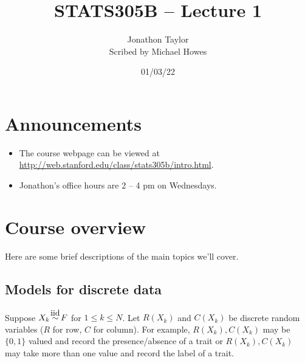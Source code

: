 




\title{STATS305B -- Lecture 1}
\author{Jonathon Taylor\\ Scribed by Michael Howes}
\date{01/03/22}

\pagestyle{fancy}
\fancyhf{}


\maketitle
\tableofcontents
\section{Announcements}
\begin{itemize}
    \item The course webpage can be viewed at \href{http://web.stanford.edu/class/stats305b/intro.html}{http://web.stanford.edu/class/stats305b/intro.html}.
    \item Jonathon's office hours are 2 -- 4 pm on Wednesdays.
\end{itemize}
\section{Course overview}
Here are some brief descriptions of the main topics we'll cover.
\subsection{Models for discrete data}
Suppose $X_k \iid F$ for $1 \le k \le N$.
Let $R(X_k)$ and $C(X_k)$ be discrete random variables ($R$ for row, $C$ for column). For example, $R(X_k), C(X_k)$ may be $\{0,1\}$ valued and record the presence/absence of a trait or $R(X_k), C(X_k)$ may take more than one value and record the label of a trait.


